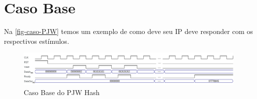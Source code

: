 \documentclass[
    12pt,
    a4paper,
    oneside,
    chapter=TITLE,
    section=TITLE,
    subsection=TITLE,
    subsubsection=TITLE,
    english,
    french,
    spanish,
    brazil,
    ]{abntex2}
\begin{document}
\section{Caso Base}
Na \autoref{fig-caso-PJW} temos um exemplo de como deve seu IP deve responder com os respectivos estímulos.

\begin{figure}[htb]
    \caption{\label{fig-caso-PJW}Caso Base do PJW Hash}
    \begin{center}
        \advance\leftskip-3cm
        \includegraphics[width=\paperwidth]{imgs/caso-PJW.png}
    \end{center}
\end{figure}
\end{document}
